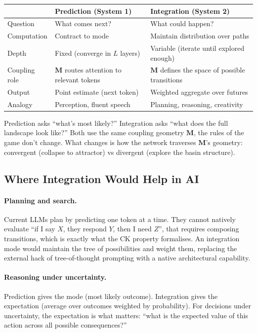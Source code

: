 \documentclass[11pt, a4paper]{article}
\newcommand{\M}{\mathbf{M}}
\theoremstyle{plain}
\theoremstyle{definition}
\theoremstyle{remark}
\begin{document}
\begin{center}
\small
\begin{tabular}{@{}lll@{}}
\toprule
& \textbf{Prediction (System 1)} & \textbf{Integration (System 2)} \\
\midrule
Question & What comes next? & What could happen? \\
Computation & Contract to mode & Maintain distribution over paths \\
Depth & Fixed (converge in $L$ layers) & Variable (iterate until explored enough) \\
Coupling role & $\M$ routes attention to relevant tokens & $\M$ defines the space of possible transitions \\
Output & Point estimate (next token) & Weighted aggregate over futures \\
Analogy & Perception, fluent speech & Planning, reasoning, creativity \\
\bottomrule
\end{tabular}
\end{center}

Prediction asks ``what's most likely?''  Integration asks ``what does the full landscape look like?''
Both use the same coupling geometry $\M$, the rules of the game don't change.
What changes is how the network traverses $\M$'s geometry: convergent (collapse to attractor) vs divergent (explore the basin structure).

\subsection{Where Integration Would Help in AI}

\paragraph{Planning and search.}
Current LLMs plan by predicting one token at a time.
They cannot natively evaluate ``if I say $X$, they respond $Y$, then I need $Z$'', that requires composing transitions, which is exactly what the CK property formalises.
An integration mode would maintain the tree of possibilities and weight them, replacing the external hack of tree-of-thought prompting with a native architectural capability.

\paragraph{Reasoning under uncertainty.}
Prediction gives the mode (most likely outcome).
Integration gives the expectation (average over outcomes weighted by probability).
For decisions under uncertainty, the expectation is what matters: ``what is the expected value of this action across all possible consequences?''
\end{document}

